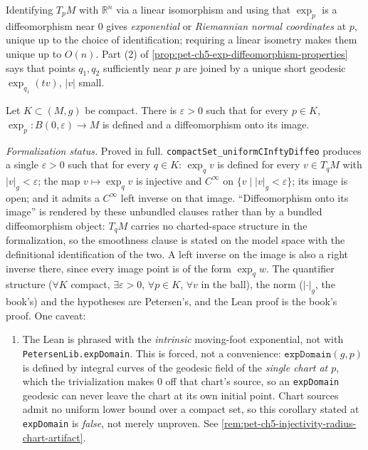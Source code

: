 \begin{remark}
  \label{rem:pet-ch5-riemannian-normal-coordinates}
  \leanok
  Identifying $T_pM$ with $\mathbb R^n$ via a linear isomorphism and using that
  $\exp_p$ is a diffeomorphism near $0$ gives \emph{exponential} or \emph{Riemannian
  normal coordinates} at $p$, unique up to the choice of identification; requiring a
  linear isometry makes them unique up to $O(n)$. Part (2) of
  \cref{prop:pet-ch5-exp-diffeomorphism-properties} says that points $q_1,q_2$
  sufficiently near $p$ are joined by a unique short geodesic $\exp_{q_1}(tv)$,
  $|v|$ small.
\end{remark}

\begin{corollary}
  \label{cor:pet-ch5-uniform-injectivity-radius-compact}
  \leanok
  Let $K\subset(M,g)$ be compact. There is $\varepsilon>0$ such that for every
  $p\in K$, $\exp_p:B(0,\varepsilon)\to M$ is defined and a diffeomorphism onto its
  image.

  \emph{Formalization status.} Proved in full.
  \texttt{compactSet\_uniformCInftyDiffeo} produces a single $\varepsilon>0$ such
  that for every $q\in K$: $\exp_q v$ is defined for every $v\in T_qM$ with
  $|v|_g<\varepsilon$; the map $v\mapsto\exp_q v$ is injective and $C^\infty$ on
  $\{v\mid|v|_g<\varepsilon\}$; its image is open; and it admits a $C^\infty$ left
  inverse on that image.  ``Diffeomorphism onto its image'' is rendered by these
  unbundled clauses rather than by a bundled diffeomorphism object: $T_qM$ carries
  no charted-space structure in the formalization, so the smoothness clause is
  stated on the model space with the definitional identification of the two.  A
  left inverse on the image is also a right inverse there, since every image point
  is of the form $\exp_q w$.  The quantifier structure ($\forall K$ compact,
  $\exists\varepsilon>0$, $\forall p\in K$, $\forall v$ in the ball), the norm
  ($|\cdot|_g$, the book's) and the hypotheses are Petersen's, and the Lean proof is
  the book's proof.  One caveat:
  \begin{enumerate}
    \item The Lean is phrased with the \emph{intrinsic} moving-foot exponential,
      not with \texttt{PetersenLib.expDomain}.  This is forced, not a convenience:
      $\texttt{expDomain}(g,p)$ is defined by integral curves of the geodesic field
      of the \emph{single chart at $p$}, which the trivialization makes $0$ off
      that chart's source, so an \texttt{expDomain} geodesic can never leave the
      chart at its own initial point.  Chart sources admit no uniform lower bound
      over a compact set, so this corollary stated at \texttt{expDomain} is
      \emph{false}, not merely unproven.  See
      \cref{rem:pet-ch5-injectivity-radius-chart-artifact}.
  \end{enumerate}
\end{corollary}
